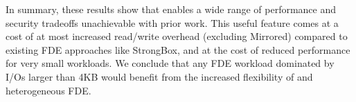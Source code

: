 In summary, these results show that \sys enables a wide range of performance and
security tradeoffs unachievable with prior work. This useful feature comes at a
cost of at most  increased read/write overhead (excluding
Mirrored) compared to existing FDE approaches like StrongBox, and at the cost of
reduced performance for very small workloads. We conclude that any FDE workload
dominated by I/Os larger than 4KB would benefit from the increased flexibility
of \sys and heterogeneous FDE.
